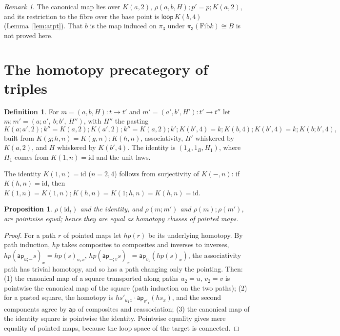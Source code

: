 \documentclass[11pt]{amsart}
\newtheorem{proposition}[theorem]{Proposition}
\theoremstyle{definition}
\newtheorem{definition}[theorem]{Definition}
\theoremstyle{remark}
\newtheorem{remark}[theorem]{Remark}
\newcommand{\ap}{\mathsf{ap}}
\newcommand{\Fib}{\mathrm{Fib}}
\newcommand{\rmap}{\rho}
\newcommand{\lp}{\mathsf{loop}}
\newcommand{\cmp}{\mathbin{;}}
\begin{document}
\begin{remark}
The canonical map lies over $K(a,2)$, $\rmap(a,b,H)\cmp p'=p\cmp K(a,2)$, and
its restriction to the fibre over the base point is $\lp\,K(b,4)$
(Lemma~\ref{lem:atpt}). That $b$ is the map induced on $\pi_3$ under
$\pi_3(\Fib k)\cong B$ is not proved here.
\end{remark}

\section{The homotopy precategory of triples}\label{sec:cat}

\begin{definition}
For $m=(a,b,H):t\to t'$ and $m'=(a',b',H'):t'\to t''$ let
$m\cmp m'=(a\cmp a',\ b\cmp b',\ H'')$, with $H''$ the pasting
\[K(a\cmp a',2)\cmp k''=K(a,2)\cmp K(a',2)\cmp k''=K(a,2)\cmp k'\cmp K(b',4)
=k\cmp K(b,4)\cmp K(b',4)=k\cmp K(b\cmp b',4),\]
built from $K(g\cmp h,n)=K(g,n)\cmp K(h,n)$, associativity, $H'$ whiskered by
$K(a,2)$, and $H$ whiskered by $K(b',4)$. The identity is
$(1_A,1_B,H_1)$, where $H_1$ comes from $K(1,n)=\mathrm{id}$ and the unit laws.
\end{definition}

The identity $K(1,n)=\mathrm{id}$ ($n=2,4$) follows from surjectivity of
$K(-,n)$: if $K(h,n)=\mathrm{id}$, then
$K(1,n)=K(1,n)\cmp K(h,n)=K(1\cmp h,n)=K(h,n)=\mathrm{id}$.

\begin{proposition}\label{prop:funct}
$\rmap(\mathrm{id}_t)$ and the identity, and $\rmap(m\cmp m')$ and
$\rmap(m)\cmp\rmap(m')$, are pointwise equal; hence they are equal as homotopy
classes of pointed maps.
\end{proposition}
\begin{proof}
For a path $r$ of pointed maps let $hp(r)$ be its underlying homotopy. By path
induction, $hp$ takes composites to composites and inverses to inverses,
$hp(\ap_{u\cmp-}s)_x=hp(s)_{u_1x}$, $hp(\ap_{-\cmp v}s)_x=\ap_{v_1}(hp(s)_x)$,
the associativity path has trivial homotopy, and so has a path changing only the
pointing. Then: (1) the canonical map of a square transported along paths
$u_2=u$, $v_2=v$ is pointwise the canonical map of the square (path induction
on the two paths); (2) for a pasted square, the homotopy is
$hs'_{u_1x}\cdot\ap_{v'_1}(hs_x)$, and the second components agree by
$\ap$ of composites and reassociation; (3) the canonical map of the identity
square is pointwise the identity. Pointwise equality gives mere equality of
pointed maps, because the loop space of the target is connected.
\end{proof}
\end{document}
